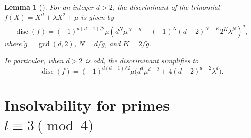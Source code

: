 \documentclass[11pt,a4paper]{amsart}
\theoremstyle{plain}
\newtheorem{lemma}[theorem]{Lemma}
\theoremstyle{definition}
\DeclareMathOperator{\disc}{disc}
\begin{document}
\begin{lemma}[{\cite[Theorem~4]{Greenfield1984}}]\label{lem:trinomial_discriminant}
For an integer $d > 2$, the discriminant of the trinomial $f(X) = X^d + \lambda X^2 + \mu$ is given by
\begin{equation}\label{eq:discriminant_formula}
\disc(f) = (-1)^{d(d-1)/2} \mu \left( d^N \mu^{N-K} - (-1)^N (d-2)^{N-K} 2^K \lambda^N \right)^{\tilde{g}},
\end{equation}
where $\tilde{g} = \gcd(d, 2)$, $N = d/\tilde{g}$, and $K = 2/\tilde{g}$. 

In particular, when $d>2$ is odd, the discriminant simplifies to
\[
\disc(f) = (-1)^{d(d-1)/2} \mu \big( d^d \mu^{d-2} + 4(d-2)^{d-2} \lambda^d \big).
\]
\end{lemma}

\section{Insolvability for primes \texorpdfstring{$l \equiv 3 \pmod 4$}{l = 3 mod 4}}\label{sec:main}
\end{document}
